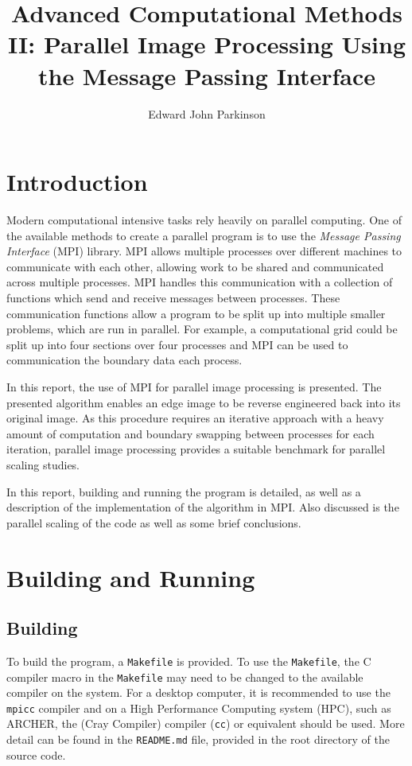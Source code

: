\documentclass[11pt, a4paper]{article}
\begin{document}
	\title{Advanced Computational Methods II: Parallel Image Processing Using the Message Passing Interface}
	\author{Edward John Parkinson}
	\maketitle	
	
	\section{Introduction}
		Modern computational intensive tasks rely heavily on parallel computing. One of the available methods to create a parallel program is to use the \textit{Message Passing Interface} (MPI) library. MPI allows multiple processes over different machines to communicate with each other, allowing work to be shared and communicated across multiple processes. MPI handles this communication with a collection of functions which send and receive messages between processes. These communication functions allow a program to be split up into multiple smaller problems, which are run in parallel. For example, a computational grid could be split up into four sections over four processes and MPI can be used to communication the boundary data each process. 
		
		In this report, the use of MPI for parallel image processing is presented. The presented algorithm enables an edge image to be reverse engineered back into its original image. As this procedure requires an iterative approach with a heavy amount of computation and boundary swapping between processes for each iteration, parallel image processing provides a suitable benchmark for parallel scaling studies.
		
		In this report, building and running the  program is detailed, as well as a description of the implementation of the algorithm in MPI. Also discussed is the parallel scaling of the code as well as some brief conclusions.
	
	\section{Building and Running}
		\subsection{Building}
			To build the program, a \texttt{Makefile} is provided. To use the \texttt{Makefile}, the C compiler macro in the \texttt{Makefile} may need to be changed to the available compiler on the system. For a desktop computer, it is recommended to use the \texttt{mpicc} compiler and on a High Performance Computing system (HPC), such as ARCHER, the (Cray Compiler) compiler  (\texttt{cc}) or equivalent should be used. More detail can be found in the \texttt{README.md} file, provided in the root directory of the source code.
		
\end{document}
